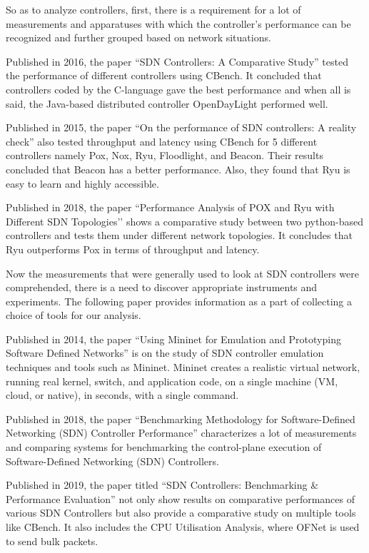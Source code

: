 So as to analyze controllers, first, there is a requirement for a lot of measurements and apparatuses with which the controller's performance can be recognized and further grouped based on network situations.

Published in 2016, the paper ``SDN Controllers: A Comparative Study'' \cite{adaptiveroute2006} tested the performance of different controllers using CBench. It concluded that controllers coded by the C-language gave the best performance and when all is said, the Java-based distributed controller OpenDayLight performed well.

Published in 2015, the paper ``On the performance of SDN controllers: A reality check'' \cite{realitycheck}  also tested throughput and latency using CBench for 5 different controllers namely Pox, Nox, Ryu, Floodlight, and Beacon. Their results concluded that Beacon has a better performance. Also, they found that Ryu is easy to learn and highly accessible.

Published in 2018, the paper ``Performance Analysis of POX and Ryu with Different SDN Topologies’’ shows a comparative study between two python-based controllers and tests them under different network topologies. It concludes that Ryu outperforms Pox in terms of throughput and latency.

Now the measurements that were generally used to look at SDN controllers were comprehended, there is a need to discover appropriate instruments and experiments. The following paper provides information as a part of collecting a choice of tools for our analysis.

Published in 2014, the paper ``Using Mininet for Emulation and Prototyping Software Defined Networks'' \cite{mininet2014} is on the study of SDN controller emulation techniques and tools such as Mininet. Mininet creates a realistic virtual network, running real kernel, switch, and application code, on a single machine (VM, cloud, or native), in seconds, with a single command.

Published in 2018, the paper ``Benchmarking Methodology for Software-Defined Networking (SDN) Controller Performance'' \cite{rfc8456} characterizes a lot of measurements and comparing systems for benchmarking the control-plane execution of Software-Defined Networking (SDN) Controllers.

Published in 2019, the paper titled ``SDN Controllers: Benchmarking \& Performance Evaluation'' \cite{zhu2019sdn} not only show results on comparative performances of various SDN Controllers but also provide a comparative study on multiple tools like CBench. It also includes the CPU Utilisation Analysis, where OFNet is used to send bulk packets.

